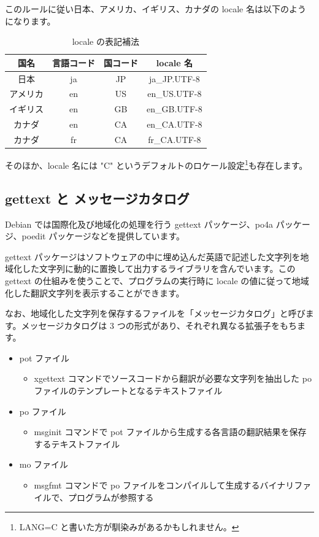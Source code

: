 \documentclass[mingoth,a4paper]{jsarticle}
\begin{document}
このルールに従い日本、アメリカ、イギリス、カナダの locale 名は以下のようになります。

\begin{table}[hbtp]
  \caption{locale の表記補法}
  \label{table:locale_display}
  \centering
  \begin{tabular}{cccc}
    \hline
    国名 & 言語コード & 国コード & locale 名 \\
    \hline
    日本 & ja & JP & ja\_JP.UTF-8 \\
    アメリカ & en & US & en\_US.UTF-8 \\
    イギリス & en & GB & en\_GB.UTF-8 \\
    カナダ & en & CA & en\_CA.UTF-8 \\
    カナダ & fr & CA & fr\_CA.UTF-8 \\
    \hline
  \end{tabular}
\end{table}

そのほか、locale 名には "C" というデフォルトのロケール設定\footnote{LANG=C と書いた方が馴染みがあるかもしれません。}も存在します。

\subsection{gettext と メッセージカタログ}

Debian では国際化及び地域化の処理を行う gettext パッケージ、po4a パッケージ、poedit パッケージなどを提供しています。

gettext パッケージはソフトウェアの中に埋め込んだ英語で記述した文字列を地域化した文字列に動的に置換して出力するライブラリを含んでいます。この gettext の仕組みを使うことで、プログラムの実行時に locale の値に従って地域化した翻訳文字列を表示することができます。


なお、地域化した文字列を保存するファイルを「メッセージカタログ」と呼びます。メッセージカタログは 3 つの形式があり、それぞれ異なる拡張子をもちます。

\begin{itemize}
\item pot ファイル
  \begin{itemize}
  \item xgettext コマンドでソースコードから翻訳が必要な文字列を抽出した po ファイルのテンプレートとなるテキストファイル
  \end{itemize}
\item po ファイル
  \begin{itemize}
  \item msginit コマンドで pot ファイルから生成する各言語の翻訳結果を保存するテキストファイル
  \end{itemize}
\item mo ファイル
  \begin{itemize}
  \item msgfmt コマンドで po ファイルをコンパイルして生成するバイナリファイルで、プログラムが参照する
  \end{itemize}
\end{itemize}
\end{document}
